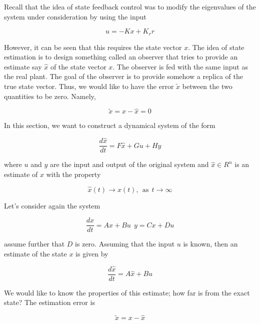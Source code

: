 Recall that the idea of state feedback control was to modify the eigenvalues of the system under consideration by using the input

\begin{equation}
u = -Kx + K_r r  
\end{equation}

However, it can be seen that this requires the state vector $x$. The idea of state estimation is to design something called an observer that tries to provide an 
estimate say $\hat{x}$ of the state vector $x$. The observer is fed with the same input as the real plant. The goal of the observer is to provide somehow a replica of the true state vector.
Thus, we would like to have the error $\tilde{x}$ between the two quantities to be zero. Namely,


\begin{equation}
\tilde{x} = x - \hat{x} = 0 
\end{equation}
 
In this section, we want to construct a dynamical system of the form

\begin{equation}
\frac{d \hat{x}}{dt} = F\hat{x} + Gu + Hy  
\end{equation}

where $u$ and $y$ are the input and output of the original system and $\hat{x} \in R^n$ is an estimate of $x$ with the property

\begin{equation}
\hat{x}(t) \rightarrow x(t), ~~ \text{as} ~~ t \rightarrow \infty  
\end{equation}

Let's consider again the system

\begin{equation}
\frac{dx}{dt} = Ax + Bu ~~ y = Cx + Du
\label{sys}
\end{equation}

assume further that $D$ is zero. Assuming that the input $u$ is known, then an estimate of the state $x$ is given by

\begin{equation}
\frac{d\hat{x}}{dt} = A\hat{x} + Bu
\label{observer_one} 
\end{equation}  

We would like to know the properties of this estimate; how far is from the exact state? The estimation error is \cite{Astrom} 

\begin{equation}
\tilde{x} = x - \hat{x} 
\end{equation} 

